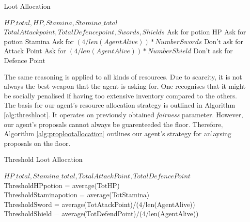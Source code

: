 \begin{algorithm}[htb]
\caption{Loot Allocation}\label{alg:lootallocation}
\begin{algorithmic} 
\scriptsize
\Require $HP\_total, HP, Stamina, Stamina\_total$
\Require $TotalAttackpoint, TotalDefencepoint, Swords, Shields$
\State  Ask for potion HP
\EndIf
{}
\State Ask for potion Stamina
\Else
{}
\State Ask for $(4/len(AgentAlive))*NumberSwords$
\Else
\State Don't ask for Attack Point
\EndIf
{}
\State Ask for $(4/len(AgentAlive))*NumberShield$
\Else
\State Don't ask for Defence Point
\EndIf
\EndIf
\end{algorithmic}
\end{algorithm}

The same reasoning is applied to all kinds of resources. Due to scarcity, it is not always the best weapon that the agent is asking for. One recognises that it might be socially penalised if having too extensive inventory compared to the others. The basis for our agent's resource allocation strategy is outlined in Algorithm \ref{alg:threshloot}. It operates on previously obtained \textit{fairness} parameter. However, our agent's proposals cannot always be guarenteeded the floor. Therefore, Algorithm \ref{alg:proplootallocation} outlines our agent's strategy for anlaysing proposals on the floor.  

\begin{algorithm}[htb]
\caption{Threshold Loot Allocation}\label{alg:threshloot}
\begin{algorithmic} 
\scriptsize
\Require $HP\_total, Stamina\_total, TotalAttackPoint,TotalDefencePoint$
ThresholdHPpotion =  average(TotHP)\\
ThresholdStaminapotion =  average(TotStamina)\\
ThresholdSword = average(TotAtackPoint)/(4/len(AgentAlive))\\
ThresholdShield = average(TotDefendPoint)/(4/len(AgentAlive))\\
\end{algorithmic}
\end{algorithm}

